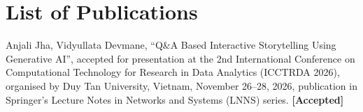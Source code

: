 \chapter{List of Publications}
\label{app:publications}

\begin{enumerate}[leftmargin=*, label={[\arabic*]}, itemsep=10pt]
    \item Anjali Jha, Vidyullata Devmane, ``Q\&A Based Interactive Storytelling Using Generative AI'', accepted for presentation at the 2nd International Conference on Computational Technology for Research in Data Analytics (ICCTRDA 2026), organised by Duy Tan University, Vietnam, November 26--28, 2026, publication in Springer's Lecture Notes in Networks and Systems (LNNS) series. \textbf{[Accepted]}
\end{enumerate}
